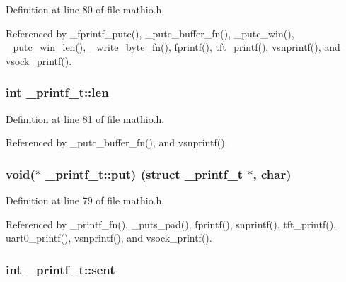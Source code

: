 Definition at line 80 of file mathio.\+h.



Referenced by \+\_\+fprintf\+\_\+putc(), \+\_\+putc\+\_\+buffer\+\_\+fn(), \+\_\+putc\+\_\+win(), \+\_\+putc\+\_\+win\+\_\+len(), \+\_\+write\+\_\+byte\+\_\+fn(), fprintf(), tft\+\_\+printf(), vsnprintf(), and vsock\+\_\+printf().

\subsubsection[{\texorpdfstring{len}{len}}]{\setlength{\rightskip}{0pt plus 5cm}int \+\_\+printf\+\_\+t\+::len}\hypertarget{struct__printf__t_a5139902cde74159b79e6418a34712bee}{}\label{struct__printf__t_a5139902cde74159b79e6418a34712bee}


Definition at line 81 of file mathio.\+h.



Referenced by \+\_\+putc\+\_\+buffer\+\_\+fn(), and vsnprintf().

\subsubsection[{\texorpdfstring{put}{put}}]{\setlength{\rightskip}{0pt plus 5cm}void($\ast$ \+\_\+printf\+\_\+t\+::put) (struct {\bf \+\_\+printf\+\_\+t} $\ast$, char)}\hypertarget{struct__printf__t_a3ef8eb0143b93d4446b04c6ce9313be7}{}\label{struct__printf__t_a3ef8eb0143b93d4446b04c6ce9313be7}


Definition at line 79 of file mathio.\+h.



Referenced by \+\_\+printf\+\_\+fn(), \+\_\+puts\+\_\+pad(), fprintf(), snprintf(), tft\+\_\+printf(), uart0\+\_\+printf(), vsnprintf(), and vsock\+\_\+printf().

\subsubsection[{\texorpdfstring{sent}{sent}}]{\setlength{\rightskip}{0pt plus 5cm}int \+\_\+printf\+\_\+t\+::sent}\hypertarget{struct__printf__t_a872716fd701166cd57bd3fffb7b77706}{}\label{struct__printf__t_a872716fd701166cd57bd3fffb7b77706}



